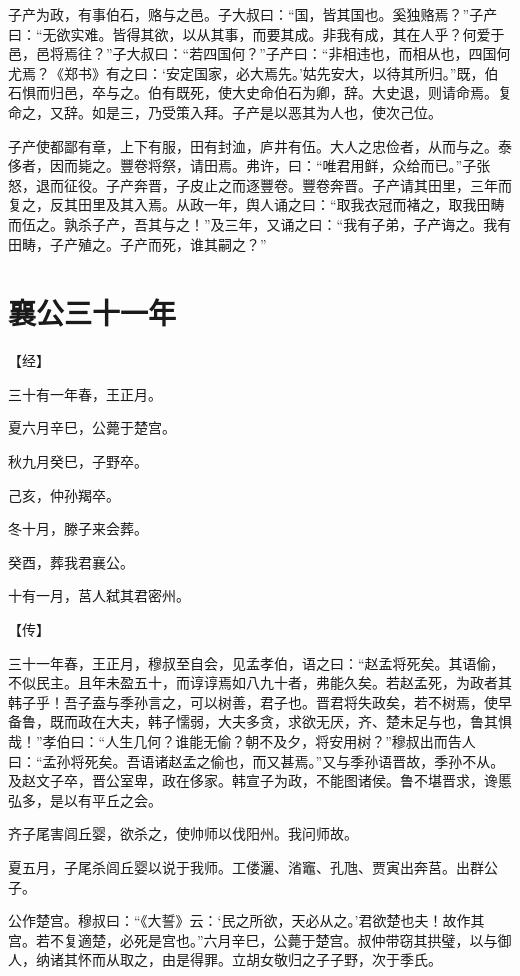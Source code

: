 \documentclass[a4paper,12pt,UTF8,twoside]{ctexbook}
\begin{document}
子产为政，有事伯石，赂与之邑。子大叔曰：“国，皆其国也。奚独赂焉？”子产曰：“无欲实难。皆得其欲，以从其事，而要其成。非我有成，其在人乎？何爱于邑，邑将焉往？”子大叔曰：“若四国何？”子产曰：“非相违也，而相从也，四国何尤焉？《郑书》有之曰：‘安定国家，必大焉先。’姑先安大，以待其所归。”既，伯石惧而归邑，卒与之。伯有既死，使大史命伯石为卿，辞。大史退，则请命焉。复命之，又辞。如是三，乃受策入拜。子产是以恶其为人也，使次己位。

子产使都鄙有章，上下有服，田有封洫，庐井有伍。大人之忠俭者，从而与之。泰侈者，因而毙之。豐卷将祭，请田焉。弗许，曰：“唯君用鲜，众给而已。”子张怒，退而征役。子产奔晋，子皮止之而逐豐卷。豐卷奔晋。子产请其田里，三年而复之，反其田里及其入焉。从政一年，舆人诵之曰：“取我衣冠而褚之，取我田畴而伍之。孰杀子产，吾其与之！”及三年，又诵之曰：“我有子弟，子产诲之。我有田畴，子产殖之。子产而死，谁其嗣之？”

\section{襄公三十一年}



【经】

三十有一年春，王正月。

夏六月辛巳，公薨于楚宫。

秋九月癸巳，子野卒。

己亥，仲孙羯卒。

冬十月，滕子来会葬。

癸酉，葬我君襄公。

十有一月，莒人弑其君密州。

【传】

三十一年春，王正月，穆叔至自会，见孟孝伯，语之曰：“赵孟将死矣。其语偷，不似民主。且年未盈五十，而谆谆焉如八九十者，弗能久矣。若赵孟死，为政者其韩子乎！吾子盍与季孙言之，可以树善，君子也。晋君将失政矣，若不树焉，使早备鲁，既而政在大夫，韩子懦弱，大夫多贪，求欲无厌，齐、楚未足与也，鲁其惧哉！”孝伯曰：“人生几何？谁能无偷？朝不及夕，将安用树？”穆叔出而告人曰：“孟孙将死矣。吾语诸赵孟之偷也，而又甚焉。”又与季孙语晋故，季孙不从。及赵文子卒，晋公室卑，政在侈家。韩宣子为政，不能图诸侯。鲁不堪晋求，谗慝弘多，是以有平丘之会。

齐子尾害闾丘婴，欲杀之，使帅师以伐阳州。我问师故。

夏五月，子尾杀闾丘婴以说于我师。工偻灑、渻竈、孔虺、贾寅出奔莒。出群公子。

公作楚宫。穆叔曰：“《大誓》云：‘民之所欲，天必从之。’君欲楚也夫！故作其宫。若不复適楚，必死是宫也。”六月辛巳，公薨于楚宫。叔仲带窃其拱璧，以与御人，纳诸其怀而从取之，由是得罪。立胡女敬归之子子野，次于季氏。
\end{document}
